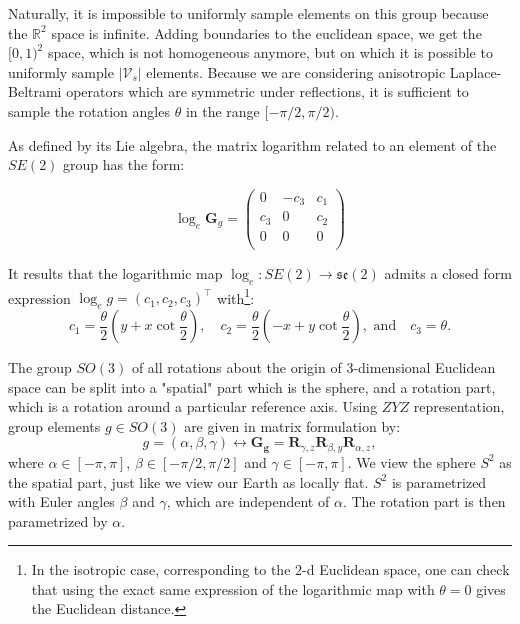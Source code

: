 \documentclass{article}
\begin{document}
Naturally, it is impossible to uniformly sample elements on this group because the $\mathbb{R}^2$ space is infinite. Adding boundaries to the euclidean space, we get the $[0, 1)^2$ space, which is not homogeneous anymore, but on which it is possible to uniformly sample $|\mathcal{V}_s|$ elements. Because we are considering anisotropic Laplace-Beltrami operators which are symmetric under reflections, it is sufficient to sample the rotation angles $\theta$ in the range $[-\pi/2, \pi/2)$.

As defined by its Lie algebra, the matrix logarithm related to an element of the $SE(2)$ group has the form:

\begin{equation}
\log_e \boldsymbol{G}_g =
\left(
\begin{array}{ccc}
0 & -c_3 & c_1 \\
c_3 & 0 & c_2 \\
0 & 0 & 0 \\
\end{array}
\right)
\end{equation}

It results that the logarithmic map $\log_e : SE(2) \to \mathfrak{se}(2)$ admits a closed form expression $\log_e g = (c_1, c_2, c_3)^\top$ with\footnote{In the isotropic case, corresponding to the $2$-d Euclidean space, one can check that using the exact same expression of the logarithmic map with $\theta = 0$ gives the Euclidean distance.}:
\begin{equation}
c_1 = \frac{\theta}{2} \left(y + x \cot \frac{\theta}{2} \right)
, \quad
c_2 = \frac{\theta}{2} \left(-x + y \cot \frac{\theta}{2} \right)
, \text{ and} \quad
c_3 = \theta.
\end{equation}


The group $SO(3)$ of all rotations about the origin of 3-dimensional Euclidean space can be split into a "spatial" part which is the sphere, and a rotation part, which is a rotation around a particular reference axis. Using $ZYZ$ representation, group elements $g \in SO(3)$ are given in matrix formulation by:
\begin{equation}
g = (\alpha, \beta, \gamma) \leftrightarrow
\boldsymbol{G_g} = \boldsymbol{R}_{\gamma, z} \boldsymbol{R}_{\beta, y} \boldsymbol{R}_{\alpha, z},
\end{equation}
where $\alpha \in [-\pi, \pi]$, $\beta \in [-\pi/2, \pi/2]$ and $\gamma \in [-\pi, \pi]$. We view the sphere $S^2$ as the spatial part, just like we view our Earth as locally flat. $S^2$ is parametrized with Euler angles $\beta$ and $\gamma$, which are independent of $\alpha$. The rotation part is then parametrized by $\alpha$.
\end{document}
